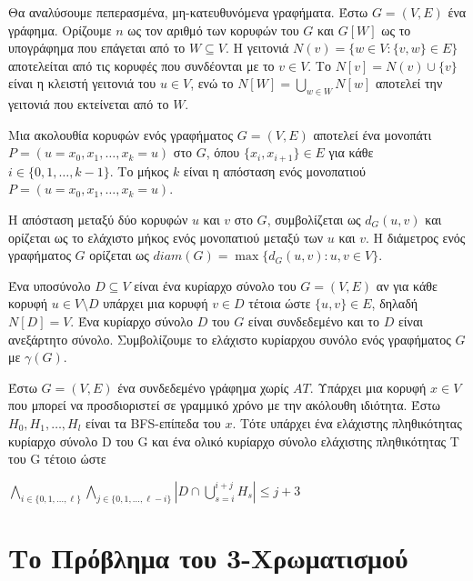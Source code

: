 Θα αναλύσουμε πεπερασμένα, μη-κατευθυνόμενα γραφήματα. Έστω $G = (V, E)$ ένα γράφημα. Ορίζουμε \( n \) ως τον αριθμό των κορυφών του \( G \) και \( G[W] \) ως το υπογράφημα που επάγεται από το \( W \subseteq V \). Η γειτονιά \( N(v) = \{w  \in V : \{v,w\} \in E\} \) αποτελείται από τις κορυφές που συνδέονται με το \( v \in V \). Το \( N[v] = N(v) \cup \{v\} \) είναι η κλειστή γειτονιά του \( u \in V \), ενώ το \( N[W] = \bigcup_{w \in W} N[w] \) αποτελεί την γειτονιά που εκτείνεται από το \( W \).

Μια ακολουθία κορυφών ενός γραφήματος \( G=(V, E) \) αποτελεί ένα μονοπάτι \( P=(u=x_0,x_1,\dots, x_k =u) \) στο \( G \), όπου \( \{x_i, x_{i+1}\} \in E \) για κάθε \( i \in \{0, 1, \dots,k-1\} \). Το μήκος \( k \) είναι η απόσταση ενός μονοπατιού \( P =(u=x_0, x_1, \dots, x_k=u) \).

Η απόσταση μεταξύ δύο κορυφών \( u \) και \( v \) στο \( G \), συμβολίζεται ως \( d_G (u,v) \) και ορίζεται ως το ελάχιστο μήκος ενός μονοπατιού μεταξύ των \( u \) και \( v \). Η διάμετρος ενός γραφήματος \( G \) ορίζεται ως \( diam(G) = \max \{d_G(u,v): u,v \in V \} \).

Ένα υποσύνολο \( D \subseteq V \) είναι ένα κυρίαρχο σύνολο του \( G = (V,E) \) αν για κάθε κορυφή \( u \in V \setminus D \) υπάρχει μια κορυφή \( v \in D \) τέτοια ώστε \( \{u, v\} \in E \), δηλαδή \( N[D] = V \). Ένα κυρίαρχο σύνολο \( D \) του \( G \) είναι συνδεδεμένο και το \( D \) είναι ανεξάρτητο σύνολο. Συμβολίζουμε το ελάχιστο κυρίαρχου συνόλο ενός γραφήματος \( G \) με \( \gamma(G) \).
\begin{definition}
	Έστω $G = (V,E)$ ένα συνδεδεμένο γράφημα χωρίς $AT$. Υπάρχει μια κορυφή $x\in V$
	που μπορεί να προσδιοριστεί σε γραμμικό χρόνο με την ακόλουθη ιδιότητα. Έστω $H_0,H_1,\dots , H_l$
	είναι τα BFS-επίπεδα του $x$. Τότε υπάρχει ένα ελάχιστης πληθικότητας κυρίαρχο σύνολο D του G
	και ένα ολικό κυρίαρχο σύνολο ελάχιστης πληθικότητας T του G τέτοιο ώστε
\end{definition}
$\bigwedge_{i\in\{0,1,\ldots,\ell\}} \bigwedge_{j\in\{0,1,\ldots,\ell-i\}} \left|D\cap\bigcup_{s=i}^{i+j}H_{s}\right| \leq j+3 $

\section{Το Πρόβλημα του 3-Χρωματισμού}
\label{sec:3-Coloring_Alg}

 








